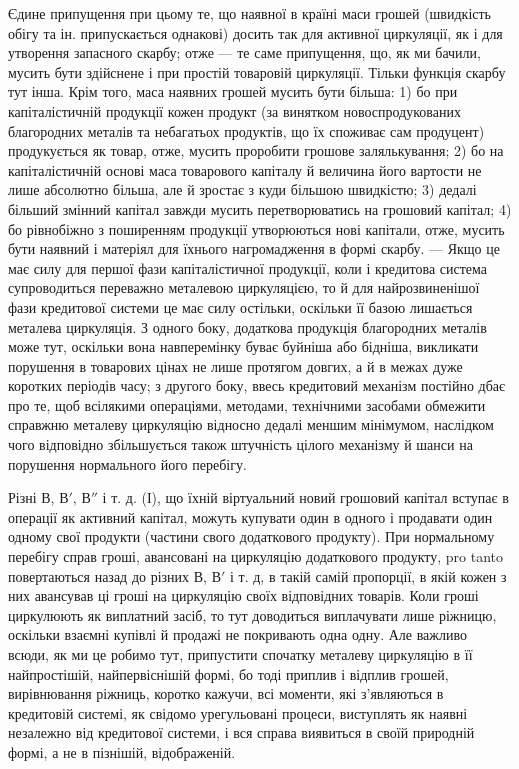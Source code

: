 Єдине припущення при цьому те, що наявної в країні маси грошей
(швидкість обігу та ін. припускається однакові) досить так для активної
циркуляції, як і для утворення запасного скарбу; отже — те саме припущення,
що, як ми бачили, мусить бути здійснене і при простій товаровій
циркуляції. Тільки функція скарбу тут інша. Крім того, маса наявних
грошей мусить бути більша: 1) бо при капіталістичній продукції
кожен продукт (за винятком новоспродукованих благородних металів та
небагатьох продуктів, що їх споживає сам продуцент) продукується як
товар, отже, мусить проробити грошове залялькування; 2) бо на капіталістичній
основі маса товарового капіталу й величина його вартости не
лише абсолютно більша, але й зростає з куди більшою швидкістю;
3) дедалі більший змінний капітал завжди мусить перетворюватись на
грошовий капітал; 4) бо рівнобіжно з поширенням продукції утворюються
нові капітали, отже, мусить бути наявний і матеріял для їхнього нагромадження
в формі скарбу. — Якщо це має силу для першої фази капіталістичної
продукції, коли і кредитова система супроводиться переважно
металевою циркуляцією, то й для найрозвиненішої фази кредитової
системи це має силу остільки, оскільки її базою лишається металева
циркуляція. З одного боку, додаткова продукція благородних металів
може тут, оскільки вона навперемінку буває буйніша або бідніша,
викликати порушення в товарових цінах не лише протягом довгих, а й
в межах дуже коротких періодів часу; з другого боку, ввесь кредитовий
механізм постійно дбає про те, щоб всілякими операціями, методами,
технічними засобами обмежити справжню металеву циркуляцію відносно
дедалі меншим мінімумом, наслідком чого відповідно збільшується також
штучність цілого механізму й шанси на порушення нормального його
перебігу.

Різні $В$, $В'$, $В''$ і т. д. (І), що їхній віртуальний новий грошовий
капітал вступає в операції як активний капітал, можуть купувати один в одного
і продавати один одному свої продукти (частини свого додаткового
продукту). При нормальному перебігу справ гроші, авансовані на циркуляцію
додаткового продукту, pro tanto повертаються назад до різних
$В$, $В'$ і т. д, в такій самій пропорції, в якій кожен з них авансував
ці гроші на циркуляцію своїх відповідних товарів. Коли гроші циркулюють
як виплатний засіб, то тут доводиться виплачувати лише ріжницю,
оскільки взаємні купівлі й продажі не покривають одна одну. Але важливо
всюди, як ми це робимо тут, припустити спочатку металеву циркуляцію
в її найпростішій, найпервіснішій формі, бо тоді приплив
і відплив грошей, вирівнювання ріжниць, коротко кажучи, всі моменти,
які з’являються в кредитовій системі, як свідомо урегульовані
процеси, виступлять як наявні незалежно від кредитової системи, і
вся справа виявиться в своїй природній формі, а не в пізнішій,
відображеній.

